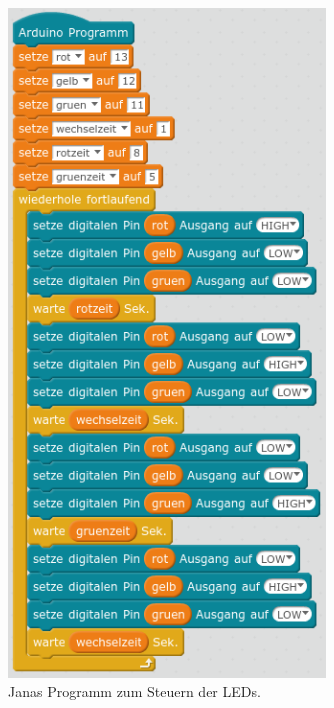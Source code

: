 \documentclass[ngerman, 11pt]{scrreprt}
\begin{document}
\begin{figure}[H]
\begin{minipage}{0.48\textwidth}
			\includegraphics[width=0.75\textwidth]{../pics/ampel-mit-variablen.png}
			\caption{Janas Programm zum Steuern der LEDs.}
		\end{minipage}
	\end{figure}
\end{document}
